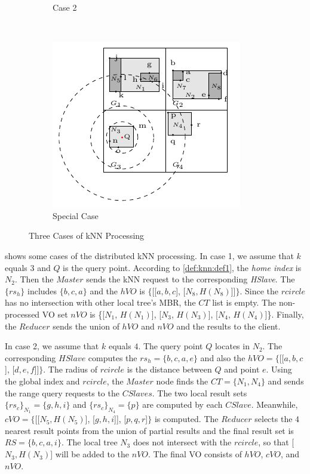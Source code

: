 \begin{figure}[t]
\begin{subfigure}[b]{.33\linewidth}
    \caption{Case 2}\label{fig:knn:cases:case2}
  \end{subfigure}~%
  \begin{subfigure}[b]{.313\linewidth}
    \centering
    \includegraphics[width=\linewidth]{figs/knn/specialcase.pdf}
    \caption{Special Case}\label{fig:knn:cases:specialcase}
  \end{subfigure}
  \caption{Three Cases of {kNN} Processing}\label{fig:knn:cases}
\end{figure}

 shows some cases of the distributed kNN processing. In case 1, we assume that $k$ equals $3$ and $Q$ is the query point. According to \cref{def:knn:def1}, the \emph{home index} is $N_{2}$. Then the $Master$ sends the kNN request to the corresponding \emph{HSlave}. The $\{rs_{h}\}$ includes $\{b, c, a\}$ and the $hVO$ is $\{$[[$a, b, c$], [$N_{8}, H(N_{8})$]]$\}$. Since the $rcircle$ has no intersection with other local tree's MBR, the $CT$ list is empty. The non-processed VO set $nVO$ is \{[$N_{1}$, $H(N_{1})$], [$N_{3}$, $H(N_{3})$], [$N_{4}$, $H(N_{4})$]\}. Finally, the $Reducer$ sends the union of $hVO$ and $nVO$ and the results to the client.

In case 2, we assume that $k$ equals $4$. The query point $Q$ locates in $N_{2}$. The corresponding $HSlave$ computes the $rs_{h}=\{b, c, a, e\}$ and also the $hVO=\{$[[$a, b, c$], [$d, e, f$]]$\}$. The radius of $rcircle$ is the distance between $Q$ and point $e$. Using the global index and $rcircle$, the $Master$ node finds the $CT=\{N_{1}, N_{4}\}$ and sends the range query requests to the $CSlaves$. The two local result sets ${\{rs_{c}\}}_{N_{1}}=\{g, h, i\}$ and ${\{rs_{c}\}}_{N_{4}}=\{p\}$ are computed by each $CSlave$. Meanwhile, $cVO=\{$[[$N_{5}, H(N_{5})$], [$g, h, i$]], [$p, q, r$]$\}$ is computed. The $Reducer$ selects the $4$ nearest result points from the union of partial results and the final result set is $RS=\{b, c, a, i\}$. The local tree $N_{3}$ does not intersect with the $rcircle$, so that [$N_{3}, H(N_{3})$] will be added to the $nVO$. The final VO consists of $hVO$, $cVO$, and $nVO$.

